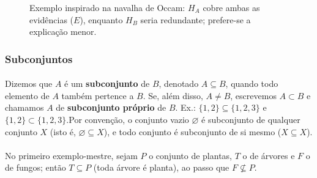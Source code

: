 \documentclass[12pt,a4paper]{article}
\def\\{}%
\begin{document}
\begin{figure}[htbp]
    \centering
    \caption{\texorpdfstring{Exemplo inspirado na navalha de Occam: $H_A$ cobre ambas as evidências ($E$), enquanto $H_B$ seria redundante; prefere-se a explicação menor.}{Exemplo inspirado na navalha de Occam}}
    \label{fig:occam-exemplo}
\end{figure}

\paragraph{}
\subsubsection{Subconjuntos}
\paragraph{}
Dizemos que \(A\) é um \textbf{subconjunto} de \(B\), denotado \(A \subseteq B\), quando todo elemento de \(A\) também pertence a \(B\). Se, além disso, \(A \neq B\), escrevemos \(A \subset B\) e chamamos \(A\) de \textbf{subconjunto próprio} de \(B\). Ex.: \( \{1,2\} \subseteq \{1,2,3\} \) e \( \{1,2\} \subset \{1,2,3\} \).Por convenção, o conjunto vazio \(\varnothing\) é subconjunto de qualquer conjunto \(X\) (isto é, \(\varnothing \subseteq X\)), e todo conjunto é subconjunto de si mesmo (\(X \subseteq X\)).

\paragraph{}
No primeiro exemplo-mestre, sejam \(P\) o conjunto de plantas, \(T\) o de árvores e \(F\) o de fungos; então \(T \subseteq P\) (toda árvore é planta), ao passo que \(F \not\subseteq P\).
\end{document}
